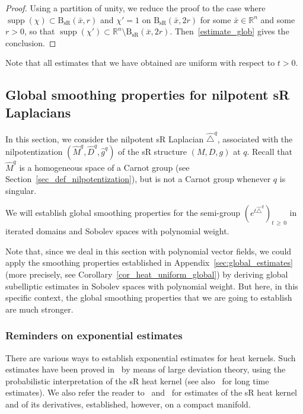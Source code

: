 \documentclass[AHL,Unicode,published]{cedram}
\newcommand*\R{\mathbb{R}}
\DeclareMathOperator{\supp}{supp}
\newcommand{\BsR}{\mathrm{B}_{\mathrm{sR}}}
\renewcommand{\geq}{\geqslant}
\begin{document}
\begin{proof}
Using a partition of unity, we reduce the proof to the case where $\supp(\chi)\subset\BsR(\bar x,r)$ and $\chi'=1$ on $\BsR(\bar x,2r)$ for some $\bar x\in\R^n$ and some $r>0$, so that $\supp(\chi')\subset\R^n\setminus\BsR(\bar x,2r)$. Then~\eqref{estimate_glob} gives the conclusion.
\end{proof}

Note that all estimates that we have obtained are uniform with respect to $t>0$.



\subsection{Global smoothing properties for nilpotent sR Laplacians}\label{sec:global_estimates_sR_weight}
In this section, we consider the nilpotent sR Laplacian $\widehat{\triangle}^q$, associated with the nilpotentization $(\widehat{M}^q,\widehat{D}^q,\widehat{g}^q)$ of the sR structure $(M,D,g)$ at $q$. Recall that $\widehat{M}^q$ is a homogeneous space of a Carnot group (see Section~\ref{sec_def_nilpotentization}), but is not a Carnot group whenever $q$ is singular.

We will establish global smoothing properties for the semi-group $(e^{t\widehat{\triangle}^q})_{t\,\geq\,0}$ in iterated domains and Sobolev spaces with polynomial weight.

Note that, since we deal in this section with polynomial vector fields, we could apply the smoothing properties established in Appendix~\ref{sec:global_estimates} (more precisely, see Corollary~\ref{cor_heat_uniform_global}) by deriving global subelliptic estimates in Sobolev spaces with polynomial weight. But here, in this specific context, the global smoothing properties that we are going to establish are much stronger.


\subsubsection{Reminders on exponential estimates}
There are various ways to establish exponential estimates for heat kernels. Such estimates have been proved in~\cite{Varopoulos} by means of large deviation theory, using the probabilistic interpretation of the sR heat kernel (see also~\cite{KusuokaStroock} for long time estimates). We also refer the reader to~\cite{Sac-84} and~\cite{Je-Sa-86} for estimates of the sR heat kernel and of its derivatives, established, however, on a compact manifold.
\end{document}
